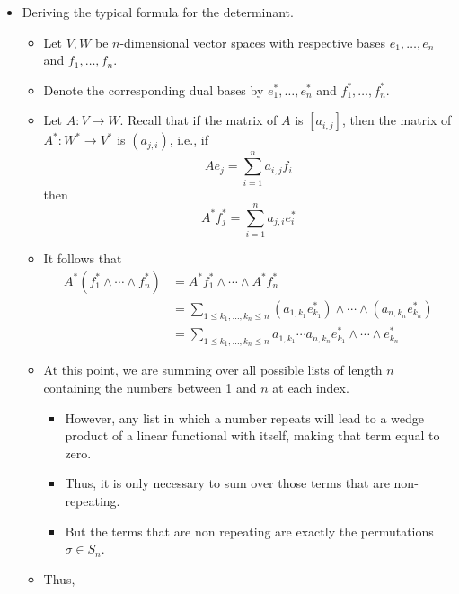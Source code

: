 \documentclass[../notes.tex]{subfiles}
\begin{document}
\begin{itemize}
\begin{proof}
\begin{equation*}
            A^*\omega = B^*\imath_W^*\omega
        \end{equation*}
        where $\imath_W^*\omega=0$ as an element of $\lam[n]{W^*}$.
    \end{proof}
    \item Deriving the typical formula for the determinant.
    \begin{itemize}
        \item Let $V,W$ be $n$-dimensional vector spaces with respective bases $e_1,\dots,e_n$ and $f_1,\dots,f_n$.
        \item Denote the corresponding dual bases by $e_1^*,\dots,e_n^*$ and $f_1^*,\dots,f_n^*$.
        \item Let $A:V\to W$. Recall that if the matrix of $A$ is $[a_{i,j}]$, then the matrix of $A^*:W^*\to V^*$ is $(a_{j,i})$, i.e., if
        \begin{equation*}
            Ae_j = \sum_{i=1}^na_{i,j}f_i
        \end{equation*}
        then
        \begin{equation*}
            A^*f_j^* = \sum_{i=1}^na_{j,i}e_i^*
        \end{equation*}
        \item It follows that
        \begin{align*}
            A^*(f_1^*\wedge\cdots\wedge f_n^*) &= A^*f_1^*\wedge\cdots\wedge A^*f_n^*\\
            &= \sum_{1\leq k_1,\dots,k_n\leq n}(a_{1,k_1}e_{k_1}^*)\wedge\cdots\wedge(a_{n,k_n}e_{k_n}^*)\\
            &= \sum_{1\leq k_1,\dots,k_n\leq n}a_{1,k_1}\cdots a_{n,k_n}e_{k_1}^*\wedge\cdots\wedge e_{k_n}^*
        \end{align*}
        \item At this point, we are summing over all possible lists of length $n$ containing the numbers between 1 and $n$ at each index.
        \begin{itemize}
            \item However, any list in which a number repeats will lead to a wedge product of a linear functional with itself, making that term equal to zero.
            \item Thus, it is only necessary to sum over those terms that are non-repeating.
            \item But the terms that are non repeating are exactly the permutations $\sigma\in S_n$.
        \end{itemize}
        \item Thus,

\end{itemize}
\end{itemize}
\end{document}
